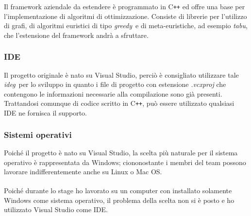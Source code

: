 Il framework aziendale da estendere è programmato in C\texttt{++} ed offre una base per l'implementazione di algoritmi di ottimizzazione. Consiste di librerie per l'utilizzo di grafi, di algoritmi euristici di tipo \emph{\gls{greedy}}\glsfirstoccur\ e di meta-euristiche, ad esempio \emph{\gls{tabu}}\glsfirstoccur, che l'estensione del framework andrà a sfruttare.

\subsubsection{IDE}
Il progetto originale è nato su Visual Studio, perciò è consigliato utilizzare tale \emph{\gls{ideg}}\glsfirstoccur\  per lo sviluppo in quanto i file di progetto con estensione \textit{.vcxproj} che contengono le informazioni necessarie alla compilazione sono già presenti.\\ Trattandosi comunque di codice scritto in C\texttt{++}, può essere utilizzato qualsiasi IDE ne fornisca il supporto.

\subsubsection{Sistemi operativi}
Poiché il progetto è nato su Visual Studio, la scelta più naturale per il sistema operativo è rappresentata da Windows; ciononostante i membri del team possono lavorare indifferentemente anche su Linux o Mac OS. \\
\\
Poiché durante lo stage ho lavorato su un computer con installato solamente Windows come sistema operativo, il problema della scelta non si è posto e ho utilizzato Visual Studio come IDE.

\newpage
